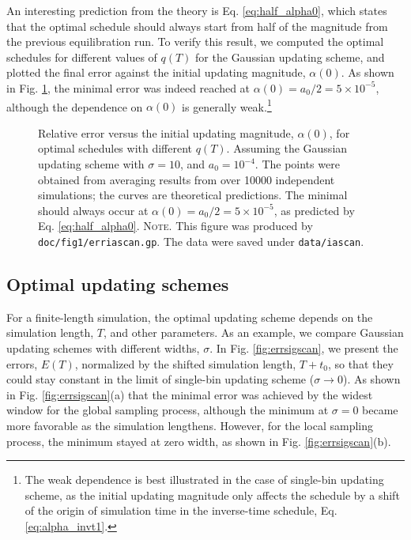 \documentclass[reprint, floatfix]{revtex4-1}
\newcommand{\note}[1]{{\color{DarkGreen}\footnotesize \textsc{Note.} #1}}
\newcommand{\Err}{E}
\begin{document}
An interesting prediction from the theory is Eq. \eqref{eq:half_alpha0},
which states that the optimal schedule should always start from
half of the magnitude from the previous equilibration run.
%
To verify this result,
we computed the optimal schedules
for different values of $q(T)$
for the Gaussian updating scheme,
and plotted the final error
against the initial updating magnitude, $\alpha(0)$.
%
As shown in Fig. \ref{fig:erriascan},
the minimal error was indeed reached at
$\alpha(0) = a_0/2 = 5 \times 10^{-5}$,
although the dependence on $\alpha(0)$
is generally weak.\footnote{The weak dependence is best illustrated in
the case of single-bin updating scheme,
as the initial updating magnitude only
affects the schedule by a shift of the origin of
simulation time in the inverse-time schedule,
Eq. \eqref{eq:alpha_invt1}.}


\begin{figure}[h]
\begin{center}
  \caption{
    \label{fig:erriascan}
    Relative error
    versus the initial updating magnitude, $\alpha(0)$,
    for optimal schedules with different $q(T)$.
    Assuming the Gaussian updating scheme
    with $\sigma = 10$,
    and $a_0 = 10^{-4}$.
    The points were obtained from averaging results
    from over 10000 independent simulations;
    the curves are theoretical predictions.
    The minimal should always occur at
    $\alpha(0) = a_0/2 = 5 \times 10^{-5}$,
    as predicted by Eq. \eqref{eq:half_alpha0}.
    \note{This figure was produced by
      \texttt{doc/fig1/erriascan.gp}.
      The data were saved under
      \texttt{data/iascan}.
    }%
  }
\end{center}
\end{figure}






\subsection{\label{sec:results_cmpschemes}
Optimal updating schemes}



For a finite-length simulation,
the optimal updating scheme
depends on the simulation length, $T$,
and other parameters.
%
As an example,
we compare Gaussian updating schemes
with different widths, $\sigma$.
%
In Fig. \ref{fig:errsigscan},
we present the errors, $\Err(T)$,
normalized by the shifted simulation length, $T+t_0$,
so that they could
stay constant in the limit of single-bin updating scheme
($\sigma \to 0$).
%
As shown in Fig. \ref{fig:errsigscan}(a)
that the minimal error was achieved
by the widest window %
for the global sampling process,
%
although
the minimum at $\sigma = 0$ became more favorable
as the simulation lengthens.
%
However,
for the local sampling process,
the minimum stayed at zero width,
as shown in Fig. \ref{fig:errsigscan}(b).
\end{document}
